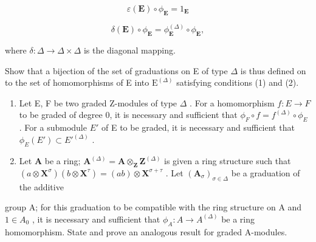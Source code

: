 \[
\varepsilon (\mathbf {E}) \circ \phi_ {\mathbf {E}} = 1 _ {\mathbf {E}}\tag{1}
\]

\[
\delta (\mathbf {E}) \circ \phi_ {\mathbf {E}} = \phi_ {\mathbf {E}} ^ {(\Delta)} \circ \phi_ {\mathbf {E}},\tag{2}
\]

where \(\delta: \Delta \to \Delta \times \Delta\) is the diagonal mapping.

Show that a bijection of the set of graduations on E of type \(\Delta\) is thus defined on to the set of homomorphisms of E into \(\mathrm{E}^{(\Delta)}\) satisfying conditions (1) and (2).

\begin{enumerate}
\def\labelenumi{(\alph{enumi})}
\setcounter{enumi}{1}
\item
  Let E, F be two graded Z-modules of type \(\Delta\) . For a homomorphism \(f: E \to F\) to be graded of degree 0, it is necessary and sufficient that \(\phi_{F} \circ f = f^{(\Delta)} \circ \phi_{E}\) . For a submodule \(E'\) of E to be graded, it is necessary and sufficient that \(\phi_{E}(E') \subset E'^{(\Delta)}\) .
\item
  Let \(\mathbf{A}\) be a ring; \(\mathbf{A}^{(\Delta)} = \mathbf{A} \otimes_{\mathbf{Z}} \mathbf{Z}^{(\Delta)}\) is given a ring structure such that \((a \otimes \mathbf{X}^{\sigma})(b \otimes \mathbf{X}^{\tau}) = (ab) \otimes \mathbf{X}^{\sigma + \tau}\) . Let \((\mathbf{A}_{\sigma})_{\sigma \in \Delta}\) be a graduation of the additive
\end{enumerate}

group A; for this graduation to be compatible with the ring structure on A and \(1 \in A_{0}\) , it is necessary and sufficient that \(\phi_{A}: A \to A^{(\Delta)}\) be a ring homomorphism. State and prove an analogous result for graded A-modules.

